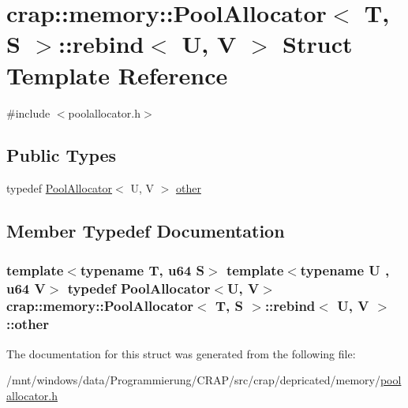 \hypertarget{structcrap_1_1memory_1_1_pool_allocator_1_1rebind}{\section{crap\-:\-:memory\-:\-:Pool\-Allocator$<$ T, S $>$\-:\-:rebind$<$ U, V $>$ Struct Template Reference}
\label{structcrap_1_1memory_1_1_pool_allocator_1_1rebind}
}


{\ttfamily \#include $<$poolallocator.\-h$>$}

\subsection*{Public Types}
\begin{DoxyCompactItemize}
\item 
typedef \hyperlink{classcrap_1_1memory_1_1_pool_allocator}{Pool\-Allocator}$<$ U, V $>$ \hyperlink{structcrap_1_1memory_1_1_pool_allocator_1_1rebind_a215299e416bbe434895de6812f3d4659}{other}
\end{DoxyCompactItemize}


\subsection{Member Typedef Documentation}
\hypertarget{structcrap_1_1memory_1_1_pool_allocator_1_1rebind_a215299e416bbe434895de6812f3d4659}{
\subsubsection[{other}]{\setlength{\rightskip}{0pt plus 5cm}template$<$typename T, u64 S$>$ template$<$typename U , u64 V$>$ typedef {\bf Pool\-Allocator}$<$U, V$>$ {\bf crap\-::memory\-::\-Pool\-Allocator}$<$ T, S $>$\-::{\bf rebind}$<$ U, V $>$\-::{\bf other}}}\label{structcrap_1_1memory_1_1_pool_allocator_1_1rebind_a215299e416bbe434895de6812f3d4659}


The documentation for this struct was generated from the following file\-:\begin{DoxyCompactItemize}
\item 
/mnt/windows/data/\-Programmierung/\-C\-R\-A\-P/src/crap/depricated/memory/\hyperlink{poolallocator_8h}{poolallocator.\-h}\end{DoxyCompactItemize}
